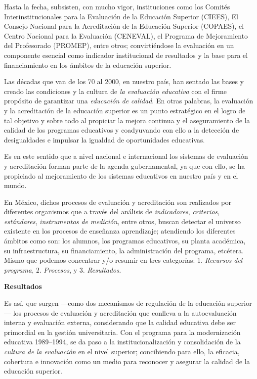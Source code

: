  
 Hasta la fecha, subsisten,
con mucho vigor, instituciones como los Comités Interinstitucionales para
la Evaluación de la Educación Superior (CIEES), El Consejo Nacional para la
Acreditación de la Educación Superior (COPAES), el Centro Nacional para la
Evaluación (CENEVAL),
el Programa de Mejoramiento del Profesorado (PROMEP), entre otros;
convirtiéndose la evaluación en un componente esencial como indicador
institucional de resultados y la base  para el financiamiento en los
ámbitos de la educación superior.

 
Las décadas que van de los 70 al 2000, en nuestro país, han sentado las
bases y creado las condiciones y la  cultura de \textit{la evaluación
educativa} con el firme propósito de garantizar una \textit{educación de
calidad}. En otras palabras, la evaluación y la acreditación de la
educación superior es un punto estratégico en el logro de tal objetivo y
sobre todo al propiciar  la mejora continua y el aseguramiento de la
calidad de los programas educativos y coadyuvando con ello a la detección
de desigualdades e impulsar la igualdad de oportunidades educativas. 
\enlargethispage{1\baselineskip}
 
Es en este sentido que a nivel nacional e internacional los sistemas de
evaluación y acreditación forman parte de la agenda gubernamental, ya que
con ello, se ha propiciado al mejoramiento de los sistemas educativos en
nuestro país y en el mundo. 

 
En México, dichos procesos de evaluación y acreditación son realizados por
diferentes organismos que a través del análisis de \textit{indicadores},
\textit{criterios}, \textit{estándares}, \textit{instrumentos de medición},
entre otros, buscan detectar  el universo existente en los procesos de
enseñanza aprendizaje;  atendiendo los diferentes ámbitos como son: los
alumnos, los programas educativos, su planta académica, su infraestructura,
su financiamiento, la administración del programa, etcétera. Mismo que
podemos concentrar y\slash{}o resumir en  tres categorías: 1. \textit{Recursos del
programa}, 2. \textit{Procesos}, y 3. \textit{Resultados}.


\medskip
\textbf{Resultados}

 
Es así, que surgen ---como dos mecanismos de regulación de la educación
superior--- los procesos de evaluación y acreditación que conlleva a la
autoevaluación interna y evaluación externa, considerando que la calidad
educativa debe ser primordial en la gestión universitaria. Con el programa
para la modernización educativa 1989--1994, se da paso a la
institucionalización y consolidación de la \textit{cultura de la
evaluación} en el nivel superior; concibiendo para ello, la eficacia,
cobertura e innovación como un medio para reconocer y asegurar la calidad 
de la educación superior.

